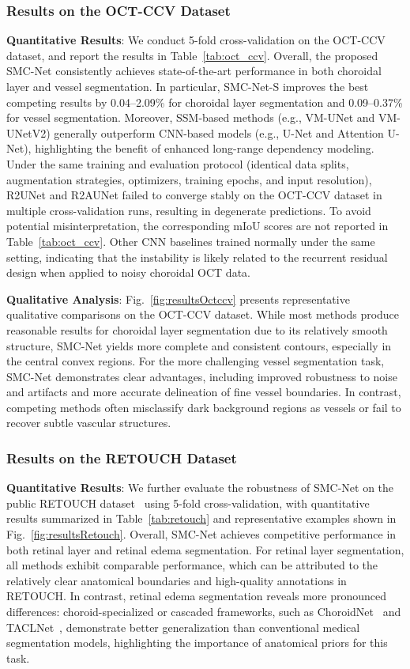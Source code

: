 \documentclass[lettersize,journal]{IEEEtran}
\begin{document}
\subsubsection{Results on the OCT-CCV Dataset}
\textbf{Quantitative Results}: We conduct 5-fold cross-validation on the OCT-CCV dataset, and report the results in Table~\ref{tab:oct_ccv}.
Overall, the proposed SMC-Net consistently achieves state-of-the-art performance in both choroidal layer and vessel segmentation.
In particular, SMC-Net-S improves the best competing results by 0.04--2.09\% for choroidal layer segmentation and 0.09--0.37\% for vessel segmentation.
Moreover, SSM-based methods (e.g., VM-UNet and VM-UNetV2) generally outperform CNN-based models (e.g., U-Net and Attention U-Net), highlighting the benefit of enhanced long-range dependency modeling.
{\color{red}
Under the same training and evaluation protocol (identical data splits, augmentation strategies, optimizers, training epochs, and input resolution), R2UNet and R2AUNet failed to converge stably on the OCT-CCV dataset in multiple cross-validation runs, resulting in degenerate predictions.
To avoid potential misinterpretation, the corresponding mIoU scores are not reported in Table~\ref{tab:oct_ccv}.
Other CNN baselines trained normally under the same setting, indicating that the instability is likely related to the recurrent residual design when applied to noisy choroidal OCT data.
}

\textbf{Qualitative Analysis}: Fig.~\ref{fig:resultsOctccv} presents representative qualitative comparisons on the OCT-CCV dataset.
While most methods produce reasonable results for choroidal layer segmentation due to its relatively smooth structure, SMC-Net yields more complete and consistent contours, especially in the central convex regions.
For the more challenging vessel segmentation task, SMC-Net demonstrates clear advantages, including improved robustness to noise and artifacts and more accurate delineation of fine vessel boundaries.
In contrast, competing methods often misclassify dark background regions as vessels or fail to recover subtle vascular structures.

\subsubsection{Results on the RETOUCH Dataset}
\textbf{Quantitative Results}: We further evaluate the robustness of SMC-Net on the public RETOUCH dataset~\cite{RETOUCH} using 5-fold cross-validation, with quantitative results summarized in Table~\ref{tab:retouch} and representative examples shown in Fig.~\ref{fig:resultsRetouch}.
Overall, SMC-Net achieves competitive performance in both retinal layer and retinal edema segmentation.
For retinal layer segmentation, all methods exhibit comparable performance, which can be attributed to the relatively clear anatomical boundaries and high-quality annotations in RETOUCH.
In contrast, retinal edema segmentation reveals more pronounced differences: choroid-specialized or cascaded frameworks, such as ChoroidNet~\cite{choroidnet} and TACLNet~\cite{wen2024}, demonstrate better generalization than conventional medical segmentation models, highlighting the importance of anatomical priors for this task.
\end{document}
